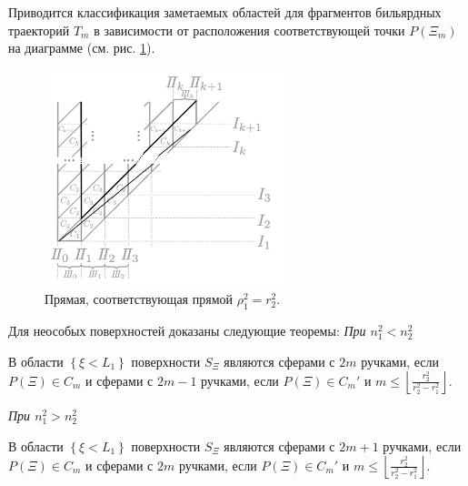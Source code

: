 Приводится классификация заметаемых областей для фрагментов бильярдных траекторий $T_m$ в зависимости от расположения соответствующей точки $P(\Xi_m)$ на диаграмме (см. рис. \ref{fig:pt10:_B1Prime_lattice}).
\begin{figure}[!htb]
\centering
\includegraphics[width=7cm]{images/ch4/section3_circular/B1Prime_lattice.pdf}
    \caption{Прямая, соответствующая прямой $\rho_1^2 = r_2^2$.}
    \label{fig:pt10:_B1Prime_lattice}
\end{figure}
Для неособых поверхностей доказаны следующие теоремы:
\textit{При $n_1^2<n_2^2$}
\begin{theorem}
В области $\left\{\xi < L_1\right\}$ поверхности $S_\Xi$ являются сферами с $2m$ ручками, если $P(\Xi) \in C_m$ и сферами с $2m-1$ ручками, если $P(\Xi) \in C_m'$ и $m \leq \left\lfloor \frac{r_2^2}{r_2^2-r_1^2} \right\rfloor$. 
\label{th:pt10:th1}
\end{theorem}
\textit{При $n_1^2 > n_2^2$}
\begin{theorem}
В области $\left\{\xi < L_1\right\}$ поверхности $S_\Xi$ являются сферами с $2m+1$ ручками, если $P(\Xi) \in C_m$ и сферами с $2m$ ручками, если $P(\Xi) \in C_m'$ и $m \leq \left\lfloor \frac{r_2^2}{r_2^2-r_1^2} \right\rfloor$. 
\label{th:pt10:th2}
\end{theorem}

